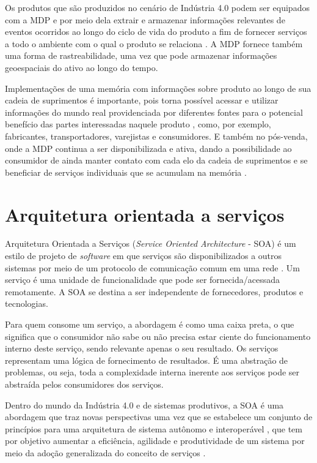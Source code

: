 Os produtos que são produzidos no cenário de Indústria 4.0 podem ser equipados com a MDP e por meio dela extrair e armazenar informações relevantes de eventos ocorridos ao longo do ciclo de vida do produto a fim de fornecer serviços a todo o ambiente com o qual o produto se relaciona \cite{brandherm2011productmemory}. A MDP fornece também uma forma de rastreabilidade, uma vez que pode armazenar informações geoespaciais do ativo ao longo do tempo.

Implementações de uma memória com informações sobre produto ao longo de sua cadeia de suprimentos é importante, pois torna possível acessar e utilizar informações do mundo real providenciada por diferentes fontes para o potencial benefício das partes interessadas naquele produto \cite{brandherm2011productmemory}, como, por exemplo, fabricantes, transportadores, varejistas e consumidores. E também no pós-venda, onde a MDP continua a ser disponibilizada e ativa, dando a possibilidade ao consumidor de ainda manter contato com cada elo da cadeia de suprimentos e se beneficiar de serviços individuais que se acumulam na memória \cite{brandherm2011productmemory}.

\section{Arquitetura orientada a serviços}
\label{sec:webservices}

Arquitetura Orientada a Serviços (\textit{Service Oriented Architecture} - SOA) é um estilo de projeto de \textit{software} em que serviços são disponibilizados a outros sistemas por meio de um protocolo de comunicação comum em uma rede \cite{bell2008soa}. Um serviço é uma unidade de funcionalidade que pode ser fornecida/acessada remotamente. A SOA se destina a ser independente de fornecedores, produtos e tecnologias.

Para quem consome um serviço, a abordagem é como uma caixa preta, o que significa que o consumidor não sabe ou não precisa estar ciente do funcionamento interno deste serviço, sendo relevante apenas o seu resultado. Os serviços representam uma lógica de fornecimento de resultados. É uma abstração de problemas, ou seja, toda a complexidade interna inerente aos serviços pode ser abstraída pelos consumidores dos serviços.

Dentro do mundo da Indústria 4.0 e de sistemas produtivos, a SOA é uma abordagem que traz novas perspectivas uma vez que se estabelece um conjunto de princípios para uma arquitetura de sistema autônomo e interoperável \cite{candido2009soa}, que tem por objetivo aumentar a eficiência, agilidade e produtividade de um sistema por meio da adoção generalizada do conceito de serviços \cite{souit2013soa}.

